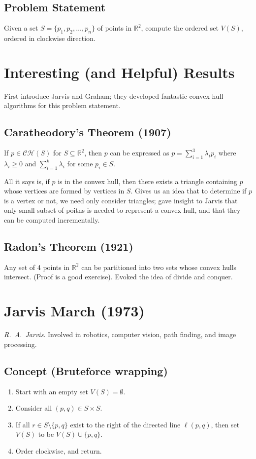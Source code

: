 \documentclass[12pt]{article}
\newcommand{\R}{\mathbb{R}}
\newcommand{\CH}{\mathcal{CH}}
\begin{document}
\subsection*{Problem Statement}
Given a set $S = \{p_{1},p_{2},\ldots,p_{n}\}$ of points in $\R^{2}$, compute the ordered set $V(S)$, ordered in clockwise direction.


\section*{Interesting (and Helpful) Results}
First introduce Jarvis and Graham; they developed fantastic convex hull algorithms for this problem statement.

\subsection*{Caratheodory's Theorem (1907)}
If $p \in \CH(S)$ for $S \subseteq \R^{2}$, then $p$ can be expressed as $p = \sum_{i=1}^{3} \lambda_{i} p_{i}$ where $\lambda_{i} \geq 0$ and $\sum_{i=1}^{k} \lambda_{i}$ for some $p_{i} \in S$.

All it says is, if $p$ is in the convex hull, then there exists a triangle containing $p$ whose vertices are formed by vertices in $S$. Gives us an idea that to determine if $p$ is a vertex or not, we need only consider triangles; gave insight to Jarvis that only small subset of poitns is needed to represent a convex hull, and that they can be computed incrementally.

\subsection*{Radon's Theorem (1921)}
Any set of 4 points in $\R^{2}$ can be partitioned into two sets whose convex hulls intersect. (Proof is a good exercise). Evoked the idea of divide and conquer.


\section*{Jarvis March (1973)}
\textit{R.~A.~Jarvis}. Involved in robotics, computer vision, path finding, and image processing.

\subsection*{Concept (Bruteforce wrapping)}
\begin{enumerate}
    \item Start with an empty set $V(S) = \emptyset$.
    \item Consider all $(p,q) \in S \times S$.
    \item If all $r \in S\setminus\{p,q\}$ exist to the right of the directed line $\ell(p,q)$, then set $V(S)$ to be $V(S) \cup \{p,q\}$.
    \item Order clockwise, and return.
\end{enumerate}
\end{document}
